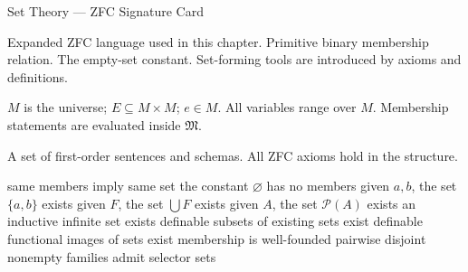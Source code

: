 \begin{lrachaptercard}{Set Theory --- ZFC Signature Card}
\begin{lracardtoprow}
\begin{lralanguageblock}
  {Expanded ZFC language used in this chapter.}
  {Primitive binary membership relation.}
  {The empty-set constant.}
  {Set-forming tools are introduced by axioms and definitions.}
\end{lralanguageblock}
\begin{lrastructureblock}
  {\(M\) is the universe; \(E\subseteq M\times M\); \(e\in M\).}
  {All variables range over \(M\).}
  {Membership statements are evaluated inside \(\mathfrak M\).}
\end{lrastructureblock}
\end{lracardtoprow}

\begin{lratheoryblock}
  {A set of first-order sentences and schemas.}
  {All ZFC axioms hold in the structure.}
\begin{lraaxiomlist}
  {same members imply same set}
  {the constant \(\varnothing\) has no members}
  {given \(a,b\), the set \(\{a,b\}\) exists}
  {given \(F\), the set \(\bigcup F\) exists}
  {given \(A\), the set \(\mathcal P(A)\) exists}
  {an inductive infinite set exists}
  {definable subsets of existing sets exist}
  {definable functional images of sets exist}
  {membership is well-founded}
  {pairwise disjoint nonempty families admit selector sets}
\end{lraaxiomlist}
\end{lratheoryblock}


\end{lrachaptercard}
